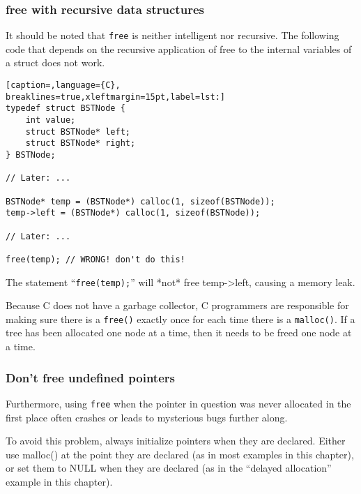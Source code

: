 \subsubsection{free with recursive data structures}
It should be noted that \texttt{free} is neither intelligent nor recursive. The
following code that depends on the recursive application of free to the
internal variables of a struct does not work.
\lstset{basicstyle=\scriptsize, numbers=left, captionpos=b, tabsize=4}
\begin{lstlisting}[caption=,language={C},
breaklines=true,xleftmargin=15pt,label=lst:]
typedef struct BSTNode {
	int value; 
	struct BSTNode* left;
	struct BSTNode* right;
} BSTNode;
 
// Later: ... 
 
BSTNode* temp = (BSTNode*) calloc(1, sizeof(BSTNode));
temp->left = (BSTNode*) calloc(1, sizeof(BSTNode));
 
// Later: ... 
 
free(temp); // WRONG! don't do this!
\end{lstlisting}

The statement ``\texttt{free(temp);}'' will *not* free temp-\textgreater{}left,
causing a memory leak.

Because C does not have a garbage collector, C programmers are responsible for
making sure there is a \texttt{free()} exactly once for each time there is a
\texttt{malloc()}.  If a tree has been allocated one node at a time, then it
needs to be freed one node at a time.

\subsubsection{Don't free undefined pointers}
Furthermore, using \texttt{free} when the pointer in question was never
allocated in the first place often crashes or leads to mysterious bugs further
along.

To avoid this problem, always initialize pointers when they are declared.
Either use malloc() at the point they are declared (as in most examples in this
chapter), or set them to NULL when they are declared (as in the ``delayed
allocation'' example in this chapter).
